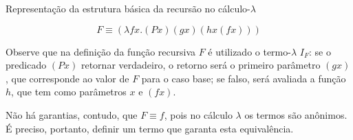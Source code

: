 \begin{frame}[fragile]{Representação da estrutura básica da recursão no cálculo-$\lambda$}

    \begin{huge}
    \[
        F\equiv (\lambda fx.(Px)(gx)(hx(fx)))
    \]
    \end{huge}

    \vspace{0.3in}

    Observe que na definição da função recursiva $F$ é utilizado o termo-$\lambda$ $I_F$: se o
    predicado $(Px)$ retornar verdadeiro, o retorno será o primeiro parâmetro $(gx)$, que 
    corresponde ao valor de $F$ para o caso base; se falso, será avaliada a função $h$, que
    tem como parâmetros $x$ e $(fx)$.

    \vspace{0.1in}
    Não há garantias, contudo, que $F\equiv f$, pois no cálculo $\lambda$ os termos são anônimos.
    É preciso, portanto, definir um termo que garanta esta equivalência. 
\end{frame}
